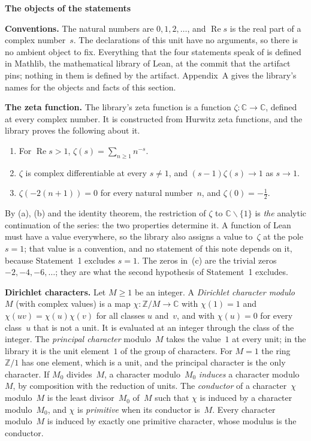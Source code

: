 \documentclass[11pt,a4paper]{article}
\newcommand{\kw}[1]{\emph{#1}}
\newcommand{\m}[1]{\mbox{$#1$}}        %
\newcommand{\sect}[2]{\refstepcounter{section}\label{#2}\par\addvspace{19pt plus 4pt minus 2pt}\Needspace{7\baselineskip}%
  \noindent\llap{{\fontsize{13.2}{16}\selectfont\bfseries\color{inkfaint}\thesection}\hspace{9pt}}%
  {\fontsize{13.2}{16}\selectfont\bfseries\color{ink}#1}\par\nopagebreak\vspace{-1pt}}
\newcommand{\subhead}[1]{\par\addvspace{9pt plus 2pt}\Needspace{4\baselineskip}\noindent\textbf{#1}\enspace\ignorespaces}
\theoremstyle{plainx}
\theoremstyle{uprightx}
\newenvironment{conventions}{\par\addvspace{5pt}\noindent\textbf{Conventions.}\enspace\ignorespaces}{\par\addvspace{3pt}}
\newcommand{\CC}{\mathbb{C}}
\newcommand{\ZZ}{\mathbb{Z}}
\newcommand{\re}{\operatorname{Re}}
\begin{document}
\sect{The objects of the statements}{s:setting}
\begin{conventions}\label{c:conventions}
The natural numbers are \m{0,1,2,\dots}, and $\re s$ is the real part of a complex number~$s$. The declarations of
this unit have no arguments, so there is no ambient object to fix. Everything that the four statements speak of is
defined in Mathlib, the mathematical library of Lean, at the commit that the artifact pins; nothing in them is
defined by the artifact. Appendix~A gives the library's names for the objects and facts of this section.
\end{conventions}

\subhead{The zeta function.} The library's zeta function is a function \m{\zeta\colon\CC\to\CC}, defined at
every complex number. It is constructed from Hurwitz zeta functions, and the library proves the following about it.
\begin{enumerate}[label=\textup{(\alph*)},leftmargin=2.3em,itemsep=2pt]
\item For \m{\re s>1}, \m{\zeta(s)=\sum_{n\ge1}n^{-s}}.
\item $\zeta$ is complex differentiable at every \m{s\ne1}, and \m{(s-1)\zeta(s)\to1} as \m{s\to1}.
\item \m{\zeta(-2(n+1))=0} for every natural number~$n$, and \m{\zeta(0)=-\tfrac12}.
\end{enumerate}
By (a), (b) and the identity theorem, the restriction of $\zeta$ to \m{\CC\smallsetminus\{1\}} is \emph{the}
analytic continuation of the series: the two properties determine it. A function of Lean must have a value
everywhere, so the library also assigns a value to~$\zeta$ at the pole \m{s=1}; that value is a convention, and no
statement of this note depends on it, because Statement~1 excludes \m{s=1}. The zeros in~(c) are the trivial zeros
\m{-2,-4,-6,\dots}; they are what the second hypothesis of Statement~1 excludes.

\subhead{Dirichlet characters.} Let \m{M\ge1} be an integer. A \kw{Dirichlet character modulo~$M$} (with complex
values) is a map \m{\chi\colon\ZZ/M\to\CC} with \m{\chi(1)=1} and \m{\chi(uv)=\chi(u)\chi(v)} for all classes $u$
and~$v$, and with \m{\chi(u)=0} for every class~$u$ that is not a unit. It is evaluated at an integer through the
class of the integer. The \kw{principal character} modulo~$M$ takes the value~$1$ at every unit; in the library it
is the unit element~$1$ of the group of characters. For \m{M=1} the ring \m{\ZZ/1} has one element, which is a
unit, and the principal character is the only character. If $M_0$ divides~$M$, a character modulo~$M_0$
\kw{induces} a character modulo~$M$, by composition with the reduction of units. The \kw{conductor} of a
character~$\chi$ modulo~$M$ is the least divisor~$M_0$ of~$M$ such that $\chi$ is induced by a character
modulo~$M_0$, and $\chi$ is \kw{primitive} when its conductor is~$M$. Every character modulo~$M$ is induced by
exactly one primitive character, whose modulus is the conductor.
\end{document}
